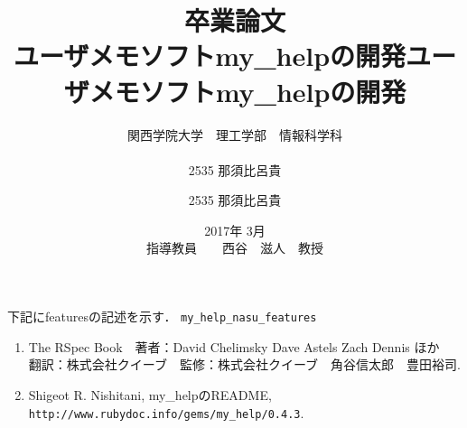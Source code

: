 \documentclass[12pt,a4paper]{jsarticle}
\begin{document}
\title{卒業論文\\
\vspace{4cm} ユーザメモソフトmy\_helpの開発}
\author{ 関西学院大学　理工学部　情報科学科\\\\2535 那須比呂貴}
\date{\vspace{3cm} 2017年  3月\\
\vspace{3cm} 指導教員　　西谷　滋人　教授}
\maketitle
\tableofcontents

\title{ユーザメモソフトmy\_helpの開発}
\author{2535 那須比呂貴}
\date{}
\maketitle
\tableofcontents






下記にfeaturesの記述を示す．
\verb|my_help_nasu_features|


\begin{enumerate}
\item The RSpec Book　著者：David Chelimsky Dave Astels Zach Dennis ほか　翻訳：株式会社クイーブ　監修：株式会社クイーブ　角谷信太郎　豊田裕司.
\item Shigeot R. Nishitani, my\_helpのREADME, \verb|http://www.rubydoc.info/gems/my_help/0.4.3|.
\end{enumerate}
\end{document}

